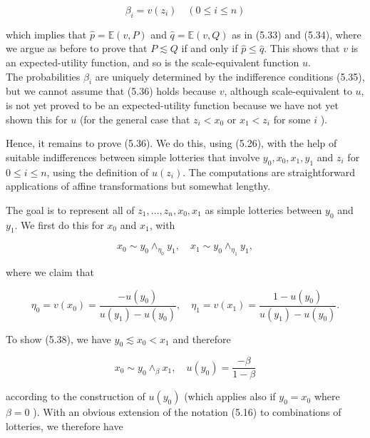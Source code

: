 \documentclass[12pt]{article}
\begin{document}
\begin{equation*}
\beta_{i}=v\left(z_{i}\right) \quad(0 \leq i \leq n) \tag{5.36}
\end{equation*}


which implies that $\hat{p}=\mathbb{E}(v, P)$ and $\hat{q}=\mathbb{E}(v, Q)$ as in (5.33) and (5.34), where we argue as before to prove that $P \lesssim Q$ if and only if $\hat{p} \leq \hat{q}$. This shows that $v$ is an expected-utility function, and so is the scale-equivalent function $u$.\\
The probabilities $\beta_{i}$ are uniquely determined by the indifference conditions (5.35), but we cannot assume that (5.36) holds because $v$, although scale-equivalent to $u$, is not yet proved to be an expected-utility function because we have not yet shown this for $u$ (for the general case that $z_{i}<x_{0}$ or $x_{1}<z_{i}$ for some $i$ ).

Hence, it remains to prove (5.36). We do this, using (5.26), with the help of suitable indifferences between simple lotteries that involve $y_{0}, x_{0}, x_{1}, y_{1}$ and $z_{i}$ for $0 \leq i \leq n$, using the definition of $u\left(z_{i}\right)$. The computations are straightforward applications of affine transformations but somewhat lengthy.

The goal is to represent all of $z_{1}, \ldots, z_{n}, x_{0}, x_{1}$ as simple lotteries between $y_{0}$ and $y_{1}$. We first do this for $x_{0}$ and $x_{1}$, with


\begin{equation*}
x_{0} \sim y_{0} \wedge_{\eta_{0}} y_{1}, \quad x_{1} \sim y_{0} \wedge_{\eta_{1}} y_{1}, \tag{5.37}
\end{equation*}


where we claim that


\begin{equation*}
\eta_{0}=v\left(x_{0}\right)=\frac{-u\left(y_{0}\right)}{u\left(y_{1}\right)-u\left(y_{0}\right)}, \quad \eta_{1}=v\left(x_{1}\right)=\frac{1-u\left(y_{0}\right)}{u\left(y_{1}\right)-u\left(y_{0}\right)} . \tag{5.38}
\end{equation*}


To show (5.38), we have $y_{0} \lesssim x_{0}<x_{1}$ and therefore


\begin{equation*}
x_{0} \sim y_{0} \wedge_{\beta} x_{1}, \quad u\left(y_{0}\right)=\frac{-\beta}{1-\beta} \tag{5.39}
\end{equation*}


according to the construction of $u\left(y_{0}\right)$ (which applies also if $y_{0}=x_{0}$ where $\beta=0$ ). With an obvious extension of the notation (5.16) to combinations of lotteries, we therefore have
\end{document}
